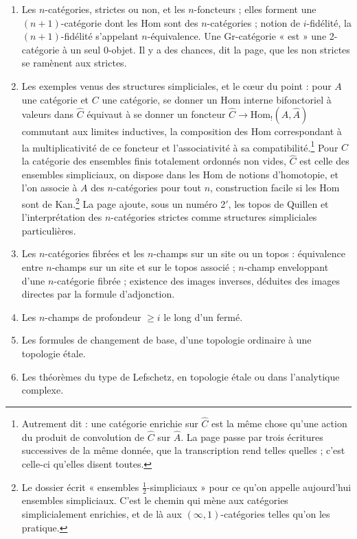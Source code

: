 \documentclass[11pt,a4paper]{article}
\begin{document}
\begin{enumerate}
\item Les $n$-catégories, strictes ou non, et les $n$-foncteurs ; elles
forment une $(n{+}1)$-catégorie dont les $\mathrm{Hom}$ sont des
$n$-catégories ; notion de $i$-fidélité, la $(n{+}1)$-fidélité s'appelant
$n$-équivalence. Une Gr-catégorie « est » une 2-catégorie à un seul 0-objet.
Il y a des chances, dit la page, que les non strictes se ramènent aux
strictes.
\item Les exemples venus des structures simpliciales, et le cœur du point :
pour $A$ une catégorie et $C$ une catégorie, se donner un $\mathrm{Hom}$
interne bifonctoriel à valeurs dans $\hat{C}$ équivaut à se donner un foncteur
$\hat{C} \to \mathrm{Hom}_{!}(\hat{A}, \hat{A})$ commutant aux limites
inductives, la composition des $\mathrm{Hom}$ correspondant à la
multiplicativité de ce foncteur et l'associativité à sa
compatibilité.\footnote{Autrement dit : une catégorie enrichie sur $\hat{C}$
est la même chose qu'une action du produit de convolution de $\hat{C}$ sur
$\hat{A}$. La page passe par trois écritures successives de la même donnée,
que la transcription rend telles quelles ; c'est celle-ci qu'elles disent
toutes.} Pour $C$ la catégorie des ensembles finis totalement ordonnés non
vides, $\hat{C}$ est celle des ensembles simpliciaux, on dispose dans les
$\mathrm{Hom}$ de notions d'homotopie, et l'on associe à $A$ des
$n$-catégories pour tout $n$, construction facile si les $\mathrm{Hom}$ sont
de Kan.\footnote{Le dossier écrit « ensembles $\tfrac12$-simpliciaux » pour
ce qu'on appelle aujourd'hui ensembles simpliciaux. C'est le chemin qui mène
aux catégories simplicialement enrichies, et de là aux $(\infty,1)$-catégories
telles qu'on les pratique.} La page ajoute, sous un numéro 2$'$, les topos de
Quillen et l'interprétation des $n$-catégories strictes comme structures
simpliciales particulières.
\item Les $n$-catégories fibrées et les $n$-champs sur un site ou un
topos : équivalence entre $n$-champs sur un site et sur le topos associé ;
$n$-champ enveloppant d'une $n$-catégorie fibrée ; existence des images
inverses, déduites des images directes par la formule d'adjonction.
\item Les $n$-champs de profondeur $\geq i$ le long d'un fermé.
\item Les formules de changement de base, d'une topologie ordinaire à une
topologie étale.
\item Les théorèmes du type de Lefschetz, en topologie étale ou dans
l'analytique complexe.

\end{enumerate}
\end{document}
